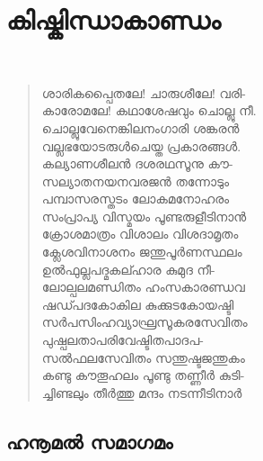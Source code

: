 

\chapter{കിഷ്കിന്ധാകാണ്ഡം}

~\\[-70pt]

\begin{verse}
ശാരികപ്പൈതലേ! ചാരുശീലേ! വരി-\\
കാരോമലേ! കഥാശേഷവും ചൊല്ലു നീ.\\
ചൊല്ലുവേനെങ്കിലനംഗാരി ശങ്കരന്‍\\
വല്ലഭയോടരുള്‍ചെയ്ത പ്രകാരങ്ങള്‍.\\
കല്യാണശീലന്‍ ദശരഥസൂനു കൗ-\\
സല്യാതനയനവരജന്‍ തന്നോടും\\
പമ്പാസരസ്തടം ലോകമനോഹരം\\
സംപ്രാപ്യ വിസ്മയം പൂണ്ടരുളീടിനാന്‍\\
ക്രോശമാത്രം വിശാലം വിശദാമൃതം\\
ക്ലേശവിനാശനം ജന്തുപൂര്‍ണസ്ഥലം\\
ഉല്‍ഫുല്ലപദ്മകല്ഹാര കുമുദ നീ-\\
ലോല്പലമണ്ഡിതം ഹംസകാരണ്ഡവ\\
ഷഡ്പദകോകില കുക്കുടകോയഷ്ടി\\
സര്‍പസിംഹവ്യാഘ്രസൂകരസേവിതം\\
പുഷ്പലതാപരിവേഷ്ടിതപാദപ-\\
സല്‍ഫലസേവിതം സന്തുഷ്ടജന്തുകം\\
കണ്ടു കൗതൂഹലം പൂണ്ടു തണ്ണീര്‍ കുടി-\\
ച്ചിണ്ടലും തീര്‍ത്തു മന്ദം നടന്നീടിനാര്‍
\end{verse}


\section{ഹനൂമല്‍ സമാഗമം}

